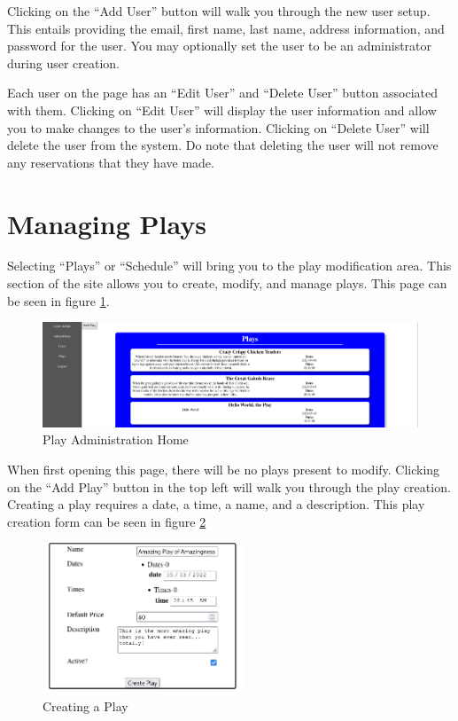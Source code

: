 Clicking on the ``Add User'' button will walk you through the new user setup. This entails providing the email, first name, last name, address information, and password for the user. You may optionally set the user to be an administrator during user creation.

Each user on the page has an ``Edit User'' and ``Delete User'' button associated with them. Clicking on ``Edit User'' will display the user information and allow you to make changes to the user's information. Clicking on ``Delete User'' will delete the user from the system. Do note that deleting the user will not remove any reservations that they have made.

\section{Managing Plays}\label{sec:managing_plays}

Selecting ``Plays'' or ``Schedule'' will bring you to the play modification area. This section of the site allows you to create, modify, and manage plays. This page can be seen in figure \ref{fig:admin_area_play_home}.

\begin{figure}[ht]
    \centering
    \includegraphics[width=14cm]{images/chapter2/admin area play home}
    \caption{Play Administration Home}
    \label{fig:admin_area_play_home}
\end{figure}

When first opening this page, there will be no plays present to modify. Clicking on the ``Add Play'' button in the top left will walk you through the play creation. Creating a play requires a date, a time, a name, and a description. This play creation form can be seen in figure \ref{fig:admin_area_create_play}

\begin{figure}[ht]
    \centering
    \includegraphics[width=6cm]{images/chapter2/admin area create play form}
    \caption{Creating a Play}
    \label{fig:admin_area_create_play}
\end{figure}

